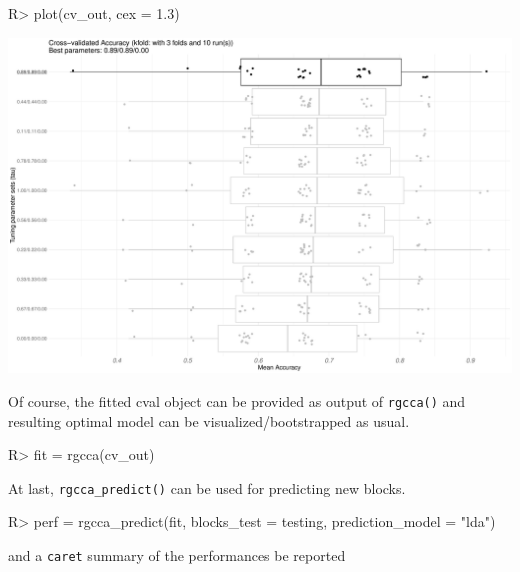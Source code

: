 \documentclass[
]{jss}
\begin{document}
\begin{CodeChunk}
\begin{CodeInput}
R> plot(cv_out, cex = 1.3)
\end{CodeInput}


\begin{center}\includegraphics{RGCCA_files/figure-latex/unnamed-chunk-30-1} \end{center}

\end{CodeChunk}

\normalsize

Of course, the fitted cval object can be provided as output of
\texttt{rgcca()} and resulting optimal model can be
visualized/bootstrapped as usual.

\footnotesize

\begin{CodeChunk}
\begin{CodeInput}
R> fit = rgcca(cv_out)
\end{CodeInput}
\end{CodeChunk}

\normalsize

At last, \texttt{rgcca\_predict()} can be used for predicting new
blocks.

\footnotesize

\begin{CodeChunk}
\begin{CodeInput}
R> perf = rgcca_predict(fit, blocks_test = testing, prediction_model = "lda")
\end{CodeInput}
\end{CodeChunk}

\normalsize

and a \texttt{caret} summary of the performances be reported
\end{document}
